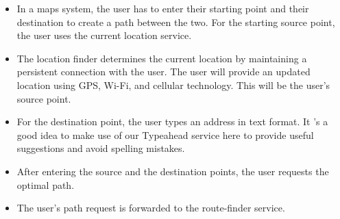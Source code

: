 \begin{itemize}
\item
\protect{}\label{Hj5AIhhWRb6Zg19BQ7yiG}
In a maps system, the user has to enter their starting point and their destination to create a path between the two. For the starting source point, the user uses the current location service.
\item
\protect{}\label{pK5wZw5slAeseTBs_1wvG}
The location finder determines the current location by maintaining a persistent connection with the user. The user will provide an updated location using GPS, Wi-Fi, and cellular technology. This will be the user's source point.
\item
\protect{}\label{Dek3RnKGplqYoFXEUMTIj}
For the destination point, the user types an address in text format. It 's a good idea to make use of our Typeahead service here to provide useful suggestions and avoid spelling mistakes.
\item
\protect{}\label{nl0nGCXW_RjEbMdrRWQto}
After entering the source and the destination points, the user requests the optimal path.
\item
\protect{}\label{fGz9e6l9E4KX2TX7VAD7m}
The user's path request is forwarded to the route-finder service.


\end{itemize}

